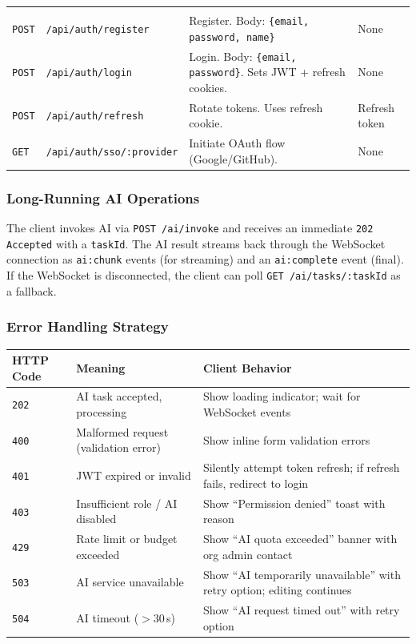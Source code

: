 \documentclass[10pt, a4paper]{article}
\begin{document}
{\begin{tabularx}{\textwidth}{@{}llXl@{}}
\addlinespace[3pt]
\multicolumn{4}{@{}l}{\textbf{User/Auth}} \\
\texttt{POST} & \texttt{/api/auth/register} & Register. Body: \texttt{\{email, password, name\}} & None \\
\texttt{POST} & \texttt{/api/auth/login} & Login. Body: \texttt{\{email, password\}}. Sets JWT + refresh cookies. & None \\
\texttt{POST} & \texttt{/api/auth/refresh} & Rotate tokens. Uses refresh cookie. & Refresh token \\
\texttt{GET} & \texttt{/api/auth/sso/:provider} & Initiate OAuth flow (Google/GitHub). & None \\
\bottomrule
\end{tabularx}
}

\subsubsection{Long-Running AI Operations}
The client invokes AI via \texttt{POST /ai/invoke} and receives an immediate \texttt{202 Accepted} with a \texttt{taskId}. The AI result streams back through the WebSocket connection as \texttt{ai:chunk} events (for streaming) and an \texttt{ai:complete} event (final). If the WebSocket is disconnected, the client can poll \texttt{GET /ai/tasks/:taskId} as a fallback.

\subsubsection{Error Handling Strategy}
{\small
\begin{tabularx}{\textwidth}{@{}llX@{}}
\toprule
\textsf{\textbf{HTTP Code}} & \textsf{\textbf{Meaning}} & \textsf{\textbf{Client Behavior}} \\
\midrule
\texttt{202} & AI task accepted, processing & Show loading indicator; wait for WebSocket events \\
\texttt{400} & Malformed request (validation error) & Show inline form validation errors \\
\texttt{401} & JWT expired or invalid & Silently attempt token refresh; if refresh fails, redirect to login \\
\texttt{403} & Insufficient role / AI disabled & Show ``Permission denied'' toast with reason \\
\texttt{429} & Rate limit or budget exceeded & Show ``AI quota exceeded'' banner with org admin contact \\
\texttt{503} & AI service unavailable & Show ``AI temporarily unavailable'' with retry option; editing continues \\
\texttt{504} & AI timeout ($>$30\,s) & Show ``AI request timed out'' with retry option \\
\bottomrule
\end{tabularx}
}
\end{document}
